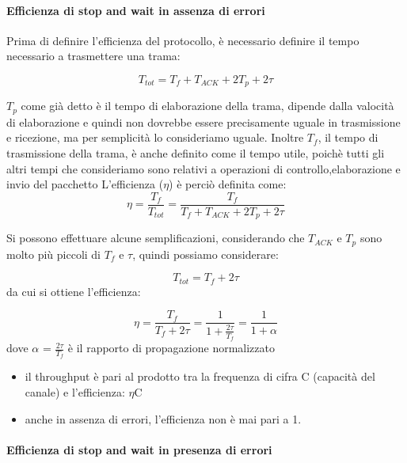 \paragraph{Efficienza di stop and wait in assenza di errori}

Prima di definire l'efficienza del protocollo, è necessario definire il tempo necessario a trasmettere una trama:

\begin{equation}
T_{tot} = T_f + T_{ACK} + 2T_p + 2\tau
\end{equation}

$T_p$ come già detto è il tempo di elaborazione della trama, dipende dalla valocità di elaborazione e quindi non dovrebbe essere precisamente uguale in trasmissione e ricezione, ma per semplicità lo consideriamo uguale.
Inoltre $T_f$, il tempo di trasmissione della trama, è anche definito come il tempo utile, poichè tutti gli altri tempi che consideriamo sono relativi a operazioni di controllo,elaborazione e invio del pacchetto
L'efficienza ($\eta$) è perciò definita come:
\begin{equation}
\eta = \frac{T_f}{T_{tot}} = \frac{T_f}{T_f + T_{ACK} + 2T_p + 2\tau}
\end{equation}

Si possono effettuare alcune semplificazioni, considerando che $T_{ACK}$ e $T_p$ sono molto più piccoli di $T_f$ e $\tau$, quindi possiamo considerare:

\begin{equation}
T_{tot} = T_f + 2\tau
\end{equation}
da cui si ottiene l'efficienza:

\begin{equation}
\eta = \frac{T_f}{T_f + 2\tau} = \frac{1}{1 + \frac{2\tau}{T_f}} = \frac{1}{1 + \alpha} 
\end{equation}
dove $\alpha$ = $\frac{2\tau}{T_f}$ è il rapporto di propagazione normalizzato

\begin{itemize}
    \item il throughput è pari al prodotto tra la frequenza di cifra C (capacità del canale) e l'efficienza: $\eta$C
    \item anche in assenza di errori, l'efficienza non è mai pari a 1.
\end{itemize}

\newpage

\paragraph{Efficienza di stop and wait in presenza di errori}

